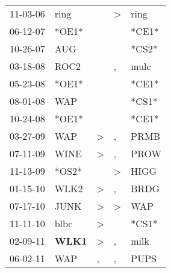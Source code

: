 \begin{supertabular}{p{0.07\textwidth}p{0.06\textwidth}p{0.02\textwidth}p{0.02\textwidth}p{0.06\textwidth}}
          11-03-06\textsuperscript{} &           ring\textsuperscript{} &               &  \textgreater &           ring\textsuperscript{} \\
          06-12-07\textsuperscript{} &                            *OE1* &               &               &                            *CE1* \\
          10-26-07\textsuperscript{} &            AUG\textsuperscript{} &               &               &                            *CS2* \\
          03-18-08\textsuperscript{} &           ROC2\textsuperscript{} &               &             , &           mulc\textsuperscript{} \\
          05-23-08\textsuperscript{} &                            *OE1* &               &               &                            *CE1* \\
          08-01-08\textsuperscript{} &            WAP\textsuperscript{} &               &               &                            *CS1* \\
          10-24-08\textsuperscript{} &                            *OE1* &               &               &                            *CE1* \\
          03-27-09\textsuperscript{} &            WAP\textsuperscript{} &  \textgreater &             , &           PRMB\textsuperscript{} \\
          07-11-09\textsuperscript{} &           WINE\textsuperscript{} &  \textgreater &             , &           PROW\textsuperscript{} \\
          11-13-09\textsuperscript{} &                            *OS2* &               &  \textgreater &           HIGG\textsuperscript{} \\
          01-15-10\textsuperscript{} &           WLK2\textsuperscript{} &  \textgreater &             , &           BRDG\textsuperscript{} \\
          07-17-10\textsuperscript{} &           JUNK\textsuperscript{} &  \textgreater &  \textgreater &            WAP\textsuperscript{} \\
          11-11-10\textsuperscript{} &           blbc\textsuperscript{} &  \textgreater &               &                            *CS1* \\
          02-09-11\textsuperscript{} &  \textbf{WLK1\textsuperscript{}} &  \textgreater &             , &           milk\textsuperscript{} \\
          06-02-11\textsuperscript{} &            WAP\textsuperscript{} &             , &             , &           PUPS\textsuperscript{} \\

\end{supertabular}
